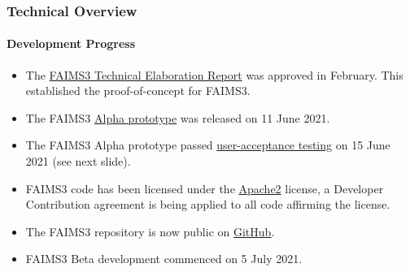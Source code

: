 \documentclass[
	aspectratio=169, %
	11pt, %
	t, %
]{beamer}
\begin{document}
     
\begin{frame}
    \frametitle{Technical Overview}
    \framesubtitle{Development Progress}        
        \begin{itemize}
            \item The  \href{https://docs.google.com/document/d/13eTN8jhJa3Pgs9GOdo7r4jtIQcskNo7ikxJcBDBKHzw/edit}{FAIMS3 Technical Elaboration Report} was approved in February. This established the proof-of-concept for FAIMS3. 
          \item The FAIMS3 \href{https://github.com/FAIMS/FAIMS3/releases/tag/v0.1.0-alpha}{Alpha prototype} was released on 11 June 2021.  
          \item The FAIMS3 Alpha prototype passed \href{https://doi.org/10.5281/zenodo.5030772}{user-acceptance testing} on 15 June 2021 (see next slide).
        \item FAIMS3 code has been licensed under the \href{https://www.apache.org/licenses/LICENSE-2.0}{Apache2} license, a Developer Contribution agreement is being applied to all code affirming the license. 
        \item The FAIMS3 repository is now public on \href{https://github.com/FAIMS/FAIMS3}{GitHub}.
        \item FAIMS3 Beta development commenced on 5 July 2021. 

    \end{itemize}



\end{frame} 


    

    
    
\end{document}
